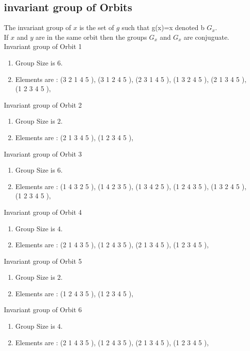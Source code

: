 \documentclass[12pt]{article}
\begin{document}
\subsection{invariant group of Orbits}
\noindent The invariant group of $x$ is the set of $g$ such that g(x)=x denoted b $G_x$.\\
If $x$ and $y$ are in the same orbit then the groups $G_x$ and  $G_x$ are conjuguate.\\
Invariant group of Orbit 1
\begin{enumerate}
\item Group Size is $6$.
\item Elements are : (3 2 1 4 5  ), (3 1 2 4 5  ), (2 3 1 4 5  ), (1 3 2 4 5  ), (2 1 3 4 5  ), (1 2 3 4 5  ), 
\end{enumerate}
Invariant group of Orbit 2
\begin{enumerate}
\item Group Size is $2$.
\item Elements are : (2 1 3 4 5  ), (1 2 3 4 5  ), 
\end{enumerate}
Invariant group of Orbit 3
\begin{enumerate}
\item Group Size is $6$.
\item Elements are : (1 4 3 2 5  ), (1 4 2 3 5  ), (1 3 4 2 5  ), (1 2 4 3 5  ), (1 3 2 4 5  ), (1 2 3 4 5  ), 
\end{enumerate}
Invariant group of Orbit 4
\begin{enumerate}
\item Group Size is $4$.
\item Elements are : (2 1 4 3 5  ), (1 2 4 3 5  ), (2 1 3 4 5  ), (1 2 3 4 5  ), 
\end{enumerate}
Invariant group of Orbit 5
\begin{enumerate}
\item Group Size is $2$.
\item Elements are : (1 2 4 3 5  ), (1 2 3 4 5  ), 
\end{enumerate}
Invariant group of Orbit 6
\begin{enumerate}
\item Group Size is $4$.
\item Elements are : (2 1 4 3 5  ), (1 2 4 3 5  ), (2 1 3 4 5  ), (1 2 3 4 5  ), 
\end{enumerate}
\end{document}
